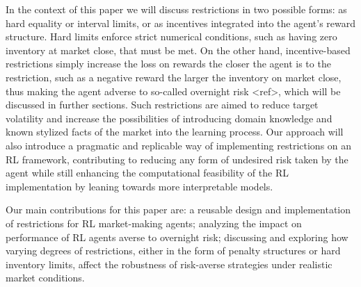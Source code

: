 In the context of this paper we will discuss restrictions in two possible forms:
as hard equality or interval limits, or as incentives integrated into the agent's reward structure.
Hard limits enforce strict numerical conditions, such as having zero inventory at market close, that must be met.
On the other hand, incentive-based restrictions simply increase the loss on rewards the closer the agent is to the restriction,
such as a negative reward the larger the inventory on market close, thus making the agent adverse to so-called overnight risk <ref>,
which will be discussed in further sections.
Such restrictions are aimed to reduce target volatility and increase the possibilities of introducing domain knowledge and known stylized facts of the market into the learning process.
Our approach will also introduce a pragmatic and replicable way of implementing restrictions on an RL framework,
contributing to reducing any form of undesired risk taken by the agent while still enhancing the computational feasibility of the RL implementation by
leaning towards more interpretable models.

Our main contributions for this paper are:
a reusable design and implementation of restrictions for RL market-making agents;
analyzing the impact on performance of RL agents averse to overnight risk;
discussing and exploring how varying degrees of restrictions, either in the form of penalty structures or hard inventory limits,
affect the robustness of risk-averse strategies under realistic market conditions.